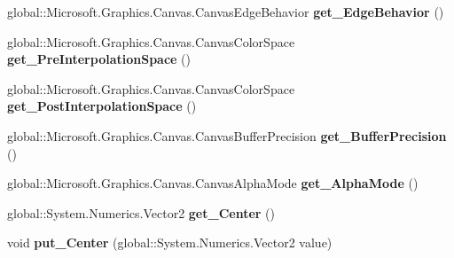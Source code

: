\begin{DoxyCompactItemize}
global\+::\+Microsoft.\+Graphics.\+Canvas.\+Canvas\+Edge\+Behavior {\bfseries get\+\_\+\+Edge\+Behavior} ()
\item 
\mbox{\label{interface_microsoft_1_1_graphics_1_1_canvas_1_1_brushes_1_1_i_canvas_radial_gradient_brush_aecbd9073ead650eee36140f73468fb9b}} 
global\+::\+Microsoft.\+Graphics.\+Canvas.\+Canvas\+Color\+Space {\bfseries get\+\_\+\+Pre\+Interpolation\+Space} ()
\item 
\mbox{\label{interface_microsoft_1_1_graphics_1_1_canvas_1_1_brushes_1_1_i_canvas_radial_gradient_brush_a2c50ad2b61a126873338d5ea34c679a4}} 
global\+::\+Microsoft.\+Graphics.\+Canvas.\+Canvas\+Color\+Space {\bfseries get\+\_\+\+Post\+Interpolation\+Space} ()
\item 
\mbox{\label{interface_microsoft_1_1_graphics_1_1_canvas_1_1_brushes_1_1_i_canvas_radial_gradient_brush_ae9f40c9850f28dbdbdb35e2a96d02bd1}} 
global\+::\+Microsoft.\+Graphics.\+Canvas.\+Canvas\+Buffer\+Precision {\bfseries get\+\_\+\+Buffer\+Precision} ()
\item 
\mbox{\label{interface_microsoft_1_1_graphics_1_1_canvas_1_1_brushes_1_1_i_canvas_radial_gradient_brush_a602ce1fabe87e97329540cbb790009fa}} 
global\+::\+Microsoft.\+Graphics.\+Canvas.\+Canvas\+Alpha\+Mode {\bfseries get\+\_\+\+Alpha\+Mode} ()
\item 
\mbox{\label{interface_microsoft_1_1_graphics_1_1_canvas_1_1_brushes_1_1_i_canvas_radial_gradient_brush_a6d312d2db512b6c12715ccec8cf5cbf1}} 
global\+::\+System.\+Numerics.\+Vector2 {\bfseries get\+\_\+\+Center} ()
\item 
\mbox{\label{interface_microsoft_1_1_graphics_1_1_canvas_1_1_brushes_1_1_i_canvas_radial_gradient_brush_abb05e3ad7b2b918326dc7c9220f7d1e5}} 
void {\bfseries put\+\_\+\+Center} (global\+::\+System.\+Numerics.\+Vector2 value)

\end{DoxyCompactItemize}
